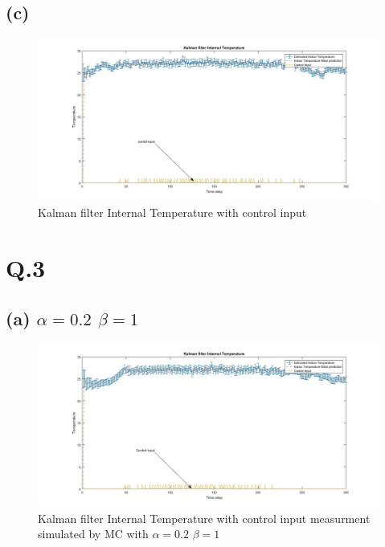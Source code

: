 \documentclass[a4paper,11pt]{article}
\begin{document}
\subsection*{(c)}
\begin{figure}[h]
  \hspace*{-6cm}
   \includegraphics[scale=0.5]{q2_2}
   \caption{Kalman filter Internal Temperature with control input}\label{fig:q2_2}
\end{figure}

\newpage
\clearpage
\section*{Q.3}
\subsection*{(a) $\alpha = 0.2$ $\beta = 1$}
\begin{figure}[h]
  \hspace*{-6cm}
   \includegraphics[scale=0.5]{q3_1}
   \caption{Kalman filter Internal Temperature with control input measurment simulated by MC with $\alpha = 0.2$ $\beta = 1$}\label{fig:q3_1}
\end{figure}
\newpage
\clearpage
\end{document}
